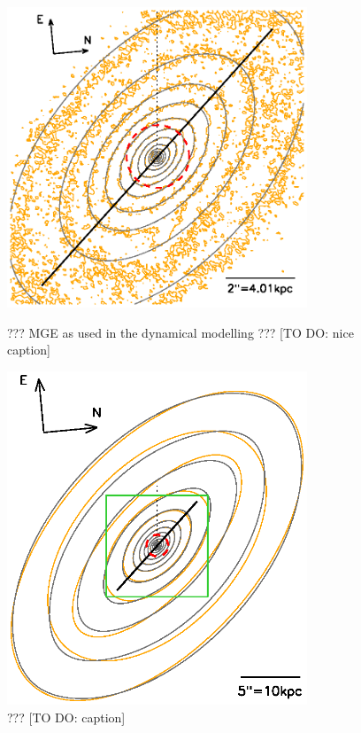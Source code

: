 \begin{figure}
\begin{minipage}[c]{\linewidth}
\centering
\includegraphics[width=0.8\textwidth]{fig/1331F814Wsci_MGE_M.ps}
\caption{??? MGE as used in the dynamical modelling ??? [TO DO: nice caption]}
\label{fig:???}
\end{minipage}
\begin{minipage}[c]{\linewidth}
\centering
\includegraphics[width=0.8\textwidth]{fig/1331F814W_MGE_disk_L.ps}
\caption{??? [TO DO: caption]}
\label{fig:???}
\end{minipage}
\end{figure}

